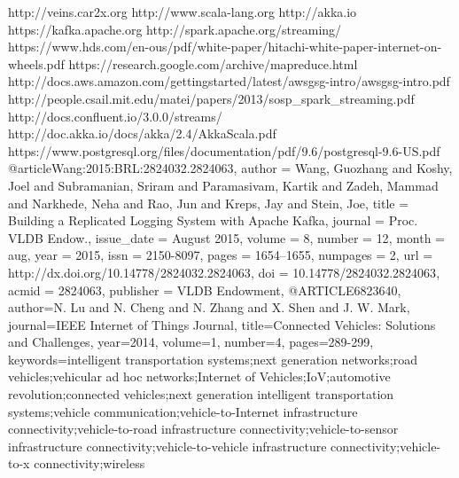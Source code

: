 \documentclass{thesis}
\begin{document}
\begin{singlespace}
\begin{thebibliography}{99}
    http://veins.car2x.org %
    http://www.scala-lang.org %
    http://akka.io %
    https://kafka.apache.org %
    http://spark.apache.org/streaming/ %
    https://www.hds.com/en-ous/pdf/white-paper/hitachi-white-paper-internet-on-wheels.pdf
    https://research.google.com/archive/mapreduce.html
    http://docs.aws.amazon.com/gettingstarted/latest/awsgsg-intro/awsgsg-intro.pdf %
    http://people.csail.mit.edu/matei/papers/2013/sosp\_spark\_streaming.pdf %
    http://docs.confluent.io/3.0.0/streams/
    http://doc.akka.io/docs/akka/2.4/AkkaScala.pdf
    https://www.postgresql.org/files/documentation/pdf/9.6/postgresql-9.6-US.pdf
@article{Wang:2015:BRL:2824032.2824063,
     author = {Wang, Guozhang and Koshy, Joel and Subramanian, Sriram and Paramasivam, Kartik and Zadeh, Mammad and Narkhede, Neha and Rao, Jun and Kreps, Jay and Stein, Joe},
     title = {Building a Replicated Logging System with Apache Kafka},
     journal = {Proc. VLDB Endow.},
     issue\_date = {August 2015},
     volume = {8},
     number = {12},
     month = aug,
     year = {2015},
     issn = {2150-8097},
     pages = {1654--1655},
     numpages = {2},
     url = {http://dx.doi.org/10.14778/2824032.2824063},
     doi = {10.14778/2824032.2824063},
     acmid = {2824063},
     publisher = {VLDB Endowment},
    } 
@ARTICLE{6823640, 
    author={N. Lu and N. Cheng and N. Zhang and X. Shen and J. W. Mark}, 
    journal={IEEE Internet of Things Journal}, 
    title={Connected Vehicles: Solutions and Challenges}, 
    year={2014}, 
    volume={1}, 
    number={4}, 
    pages={289-299}, 
    keywords={intelligent transportation systems;next generation networks;road vehicles;vehicular ad hoc networks;Internet of Vehicles;IoV;automotive revolution;connected vehicles;next generation intelligent transportation systems;vehicle communication;vehicle-to-Internet infrastructure connectivity;vehicle-to-road infrastructure connectivity;vehicle-to-sensor infrastructure connectivity;vehicle-to-vehicle infrastructure connectivity;vehicle-to-x connectivity;wireless
}}
\end{thebibliography}
\end{singlespace}
\end{document}
